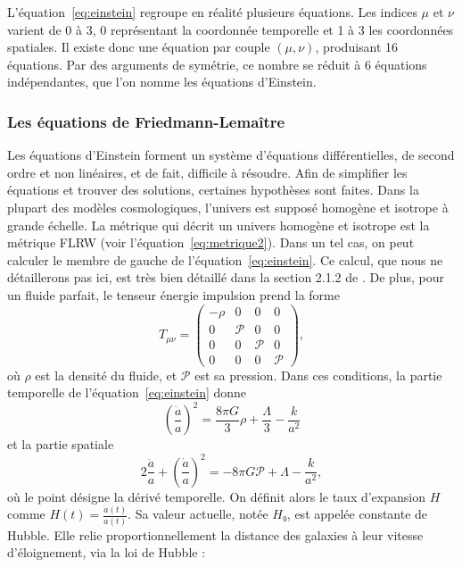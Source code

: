 \documentclass[11pt, twoside, a4paper, openright]{report}
\begin{document}
L'équation~\ref{eq:einstein} regroupe en réalité plusieurs équations. Les indices $\mu$ et $\nu$ varient de 0 à 3, 0 représentant la coordonnée temporelle et 1 à 3 les coordonnées spatiales. Il existe donc une équation par couple $(\mu, \nu)$, produisant 16 équations. Par des arguments de symétrie, ce nombre se réduit à 6 équations indépendantes, que l'on nomme les équations d'Einstein.

\subsubsection{Les équations de Friedmann-Lemaître}
Les équations d'Einstein forment un système d'équations différentielles, de second ordre et non linéaires, et de fait, difficile à résoudre. Afin de simplifier les équations et trouver des solutions, certaines hypothèses sont faites. Dans la plupart des modèles cosmologiques, l'univers est supposé homogène et isotrope à grande échelle.
La métrique qui décrit un univers homogène et isotrope est la métrique FLRW (voir l'équation~\ref{eq:metrique2}).
Dans un tel cas, on peut calculer le membre de gauche de l'équation~\ref{eq:einstein}. Ce calcul, que nous ne détaillerons pas ici, est très bien détaillé dans la section 2.1.2 de \cite{Dodelson2003}. De plus, pour un fluide parfait, le tenseur énergie impulsion prend la forme
\begin{equation}
  T_{\mu \nu} =
  \begin{pmatrix}
    -\rho & 0 & 0 & 0 \\
    0 & \mathcal{P} & 0 & 0\\
    0 & 0 & \mathcal{P} & 0\\
    0 & 0 & 0 & \mathcal{P}
  \end{pmatrix} ,
\end{equation}
où $\rho$ est la densité du fluide, et $\mathcal{P}$ est sa pression. Dans ces conditions, la partie temporelle de l'équation~\ref{eq:einstein} donne
\begin{equation}
  \label{eq:friedmann1}
  \left(\frac{\dot{a}}{a}\right)^2 = \frac{8 \pi G}{3}\rho + \frac{\Lambda}{3} - \frac{k}{a^2} 
\end{equation}
et la partie spatiale
\begin{equation}
  \label{eq:friedmann2}
  2 \frac{\ddot{a}}{a} + \left(\frac{\dot{a}}{a}\right)^2 = - 8 \pi G \mathcal{P} + \Lambda - \frac{k}{a^2} ,
\end{equation}
où le point désigne la dérivé temporelle. On définit alors le taux d'expansion $H$ comme $H(t) = \frac{\dot{a}(t)}{a(t)}$. Sa valeur actuelle, notée $H₀$, est appelée constante de Hubble. Elle relie proportionnellement la distance des galaxies à leur vitesse d'éloignement, via la loi de Hubble :
\end{document}
